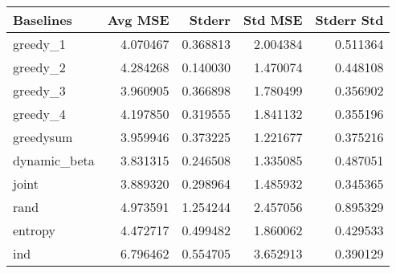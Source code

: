\begin{tabular}{lrrrr}
\toprule
    Baselines &   Avg MSE &    Stderr &   Std MSE &  Stderr Std \\
\midrule
     greedy\_1 &  4.070467 &  0.368813 &  2.004384 &    0.511364 \\
     greedy\_2 &  4.284268 &  0.140030 &  1.470074 &    0.448108 \\
     greedy\_3 &  3.960905 &  0.366898 &  1.780499 &    0.356902 \\
     greedy\_4 &  4.197850 &  0.319555 &  1.841132 &    0.355196 \\
   greedysum &  3.959946 &  0.373225 &  1.221677 &    0.375216 \\
 dynamic\_beta &  3.831315 &  0.246508 &  1.335085 &    0.487051 \\
        joint &  3.889320 &  0.298964 &  1.485932 &    0.345365 \\
         rand &  4.973591 &  1.254244 &   2.457056 &   0.895329 \\
      entropy &  4.472717 &  0.499482 &  1.860062 &    0.429533 \\
 ind &  6.796462 &  0.554705 &  3.652913 &    0.390129 \\
\bottomrule
\end{tabular}
